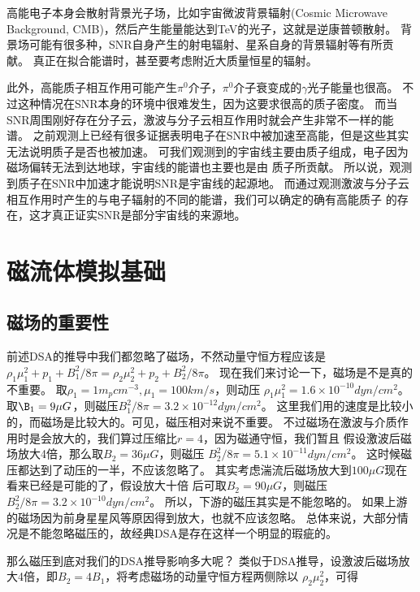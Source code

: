 高能电子本身会散射背景光子场，比如宇宙微波背景辐射(Cosmic Microwave Background,
CMB)，然后产生能量能达到TeV的光子，这就是逆康普顿散射。
背景场可能有很多种，SNR自身产生的射电辐射、星系自身的背景辐射等有所贡献。
真正在拟合能谱时，甚至要考虑附近大质量恒星的辐射。

此外，高能质子相互作用可能产生$\pi^0$介子，$\pi^0$介子衰变成的$\gamma$光子能量也很高。
不过这种情况在SNR本身的环境中很难发生，因为这要求很高的质子密度。
而当SNR周围刚好存在分子云，激波与分子云相互作用时就会产生非常不一样的能谱。
之前观测上已经有很多证据表明电子在SNR中被加速至高能，但是这些其实无法说明质子是否也被加速。
可我们观测到的宇宙线主要由质子组成，电子因为磁场偏转无法到达地球，宇宙线的能谱也主要也是由
质子所贡献。
所以说，观测到质子在SNR中加速才能说明SNR是宇宙线的起源地。
而通过观测激波与分子云相互作用时产生的与电子辐射的不同的能谱，我们可以确定的确有高能质子
的存在，这才真正证实SNR是部分宇宙线的来源地。



\section{磁流体模拟基础}
\label{TheoryMHD}

\subsection{磁场的重要性}
前述DSA的推导中我们都忽略了磁场，不然动量守恒方程应该是
$\rho_1\mu_1^2+p_1+B_1^2/8\pi=\rho_2\mu_2^2+p_2+B_2^2/8\pi$。
现在我们来讨论一下，磁场是不是真的不重要。
取$\rho_1=1 m_p cm^{-3}, \mu_1 = 100 km/s$，则动压
$\rho_1\mu_1^2=1.6 \times 10^{-10} dyn/cm^{2}$。
取$\B_1=9\mu G$，则磁压$B_1^2/8\pi=3.2 \times 10^{-12} dyn/cm^{2}$。
这里我们用的速度是比较小的，而磁场是比较大的。可见，磁压相对来说不重要。
不过磁场在激波与介质作用时是会放大的，我们算过压缩比$r=4$，因为磁通守恒，我们暂且
假设激波后磁场放大4倍，那么取$B_2=36\mu G$，则磁压
$B_2^2/8\pi=5.1 \times 10^{-11} dyn/cm^{2}$。
这时候磁压都达到了动压的一半，不应该忽略了。
其实考虑湍流后磁场放大到$100\mu G$现在看来已经是可能的了\citep{Ji2016b}，假设放大十倍
后可取$B_2=90\mu G$，则磁压$B_2^2/8\pi=3.2 \times 10^{-10} dyn/cm^{2}$。
所以，下游的磁压其实是不能忽略的。
如果上游的磁场因为前身星星风等原因得到放大，也就不应该忽略。
总体来说，大部分情况是不能忽略磁压的，故经典DSA是存在这样一个明显的瑕疵的。

那么磁压到底对我们的DSA推导影响多大呢？
类似于DSA推导，设激波后磁场放大4倍，即$B_2=4B_1$，将考虑磁场的动量守恒方程两侧除以
$\rho_2\mu_2^2$，可得

